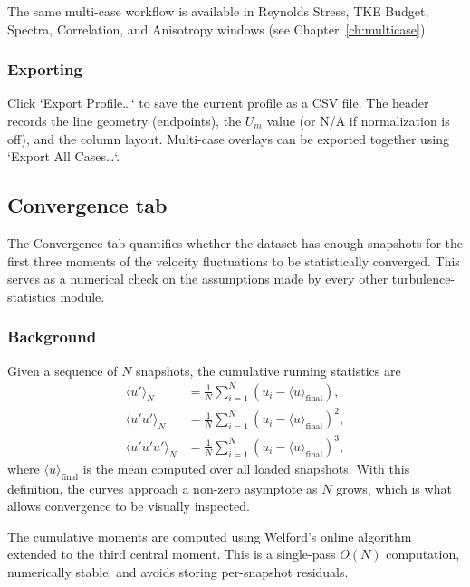 The same multi-case workflow is available in Reynolds Stress, TKE Budget, Spectra, Correlation, and Anisotropy windows (see Chapter~\ref{ch:multicase}).

\subsubsection{Exporting}

Click `Export Profile\ldots` to save the current profile as a CSV file. The header records the line geometry (endpoints), the $U_m$ value (or N/A if normalization is off), and the column layout. Multi-case overlays can be exported together using `Export All Cases\ldots`.

\subsection{Convergence tab}
\label{sec:convergence}

The Convergence tab quantifies whether the dataset has enough snapshots for the first three moments of the velocity fluctuations to be statistically converged. This serves as a numerical check on the assumptions made by every other turbulence-statistics module.

\subsubsection{Background}

Given a sequence of $N$ snapshots, the cumulative running statistics are
\begin{align}
\langle u' \rangle_N      &= \frac{1}{N} \sum_{i=1}^{N} (u_i - \langle u \rangle_{\mathrm{final}}), \\
\langle u' u' \rangle_N   &= \frac{1}{N} \sum_{i=1}^{N} (u_i - \langle u \rangle_{\mathrm{final}})^2, \\
\langle u' u' u' \rangle_N &= \frac{1}{N} \sum_{i=1}^{N} (u_i - \langle u \rangle_{\mathrm{final}})^3,
\end{align}
where $\langle u \rangle_{\mathrm{final}}$ is the mean computed over all loaded snapshots. With this definition, the curves approach a non-zero asymptote as $N$ grows, which is what allows convergence to be visually inspected.

The cumulative moments are computed using Welford's online algorithm extended to the third central moment. This is a single-pass $O(N)$ computation, numerically stable, and avoids storing per-snapshot residuals.

